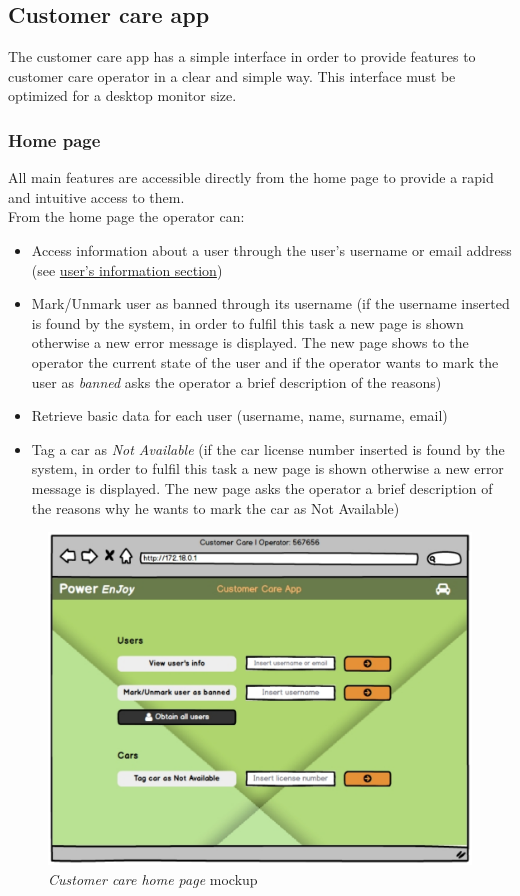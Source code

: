 \clearpage

\subsection{Customer care app}
The customer care app has a simple interface in order to provide features to customer care operator in a clear and simple way. This interface must be optimized for a desktop monitor size.

\subsubsection{Home page}
All main features are accessible directly from the home page to provide a rapid and intuitive access to them. \\
From the home page the operator can:
\begin{itemize}
	\item Access information about a user through the user's username or email address (see \hyperref[sec:userInfoCc]{user's information section}) 
	\item Mark/Unmark user as banned through its username (if the username inserted is found by the system, in order to fulfil this task a new page is shown otherwise a new error message is displayed. The new page shows to the operator the current state of the user and if the operator wants to mark the user as \emph{banned} asks the operator a brief description of the reasons)
	\item Retrieve basic data for each user (username, name, surname, email)
	\item Tag a car as \emph{Not Available} (if the car license number inserted is found by the system, in order to fulfil this task a new page is shown otherwise a new error message is displayed. The new page  asks the operator a brief description of the reasons why he wants to mark the car as {Not Available})
\end{itemize}
 
 \begin{figure}[h]
			\centering
			\includegraphics[width=0.895\linewidth]{mockups/customerCare1}
			\caption{
				\label{fig:cc1} 
				\emph{Customer care home page} mockup
			}
		\end{figure}

